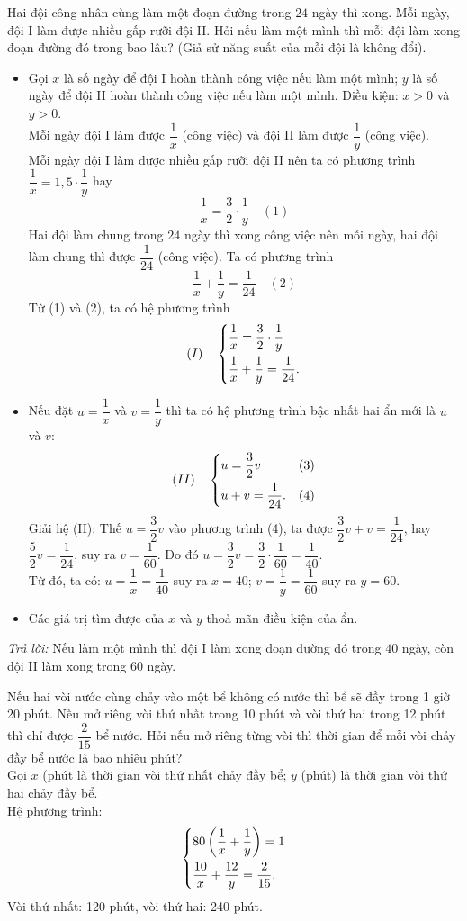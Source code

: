 \begin{vidu}
	Hai đội công nhân cùng làm một đoạn đường trong $24$ ngày thì xong. Mỗi ngày, đội I làm được nhiều gấp rưỡi đội II. Hỏi nếu làm một mình thì mỗi đội làm xong đoạn đường đó trong bao lâu? (Giả sử năng suất của mỗi đội là không đổi).
	\doicot
	\begin{itemize}
		\item Gọi $x$ là số ngày để đội I hoàn thành công việc nếu làm một mình; $y$ là số ngày để đội II hoàn thành công việc nếu làm một mình. Điều kiện: $x > 0$ và $y > 0$.\\
		Mỗi ngày đội I làm được $\dfrac{1}{x}$ (công việc) và đội II làm được $\dfrac{1}{y}$ (công việc).\\
		Mỗi ngày đội I làm được nhiều gấp rưỡi đội II nên ta có phương trình $\dfrac{1}{x} = 1,5 \cdot \dfrac{1}{y}$ hay 
		$$\dfrac{1}{x} = \dfrac{3}{2} \cdot \dfrac{1}{y} \quad (1)$$
		Hai đội làm chung trong $24$ ngày thì xong công việc nên mỗi ngày, hai đội làm chung thì được $\dfrac{1}{24}$ (công việc). Ta có phương trình
		$$\dfrac{1}{x} + \dfrac{1}{y} = \dfrac{1}{24} \quad (2)$$
		Từ (1) và (2), ta có hệ phương trình 
		$$(I)\quad\left\{\begin{aligned}&\dfrac{1}{x} = \dfrac{3}{2} \cdot \dfrac{1}{y} \\ &\dfrac{1}{x} + \dfrac{1}{y} = \dfrac{1}{24}.\end{aligned}\right.$$
		\item Nếu đặt $u = \dfrac{1}{x}$ và $v = \dfrac{1}{y}$ thì ta có hệ phương trình bậc nhất hai ẩn mới là $u$ và $v$:
		$$(II)\quad\left\{\begin{aligned}&u = \dfrac{3}{2}v & (3) \\ &u + v = \dfrac{1}{24}. & (4)\end{aligned}\right.$$
		Giải hệ (II): Thế $u = \dfrac{3}{2}v$ vào phương trình (4), ta được $\dfrac{3}{2}v + v = \dfrac{1}{24}$, hay $\dfrac{5}{2}v = \dfrac{1}{24}$, suy ra $v = \dfrac{1}{60}$. Do đó $u = \dfrac{3}{2}v = \dfrac{3}{2} \cdot \dfrac{1}{60} = \dfrac{1}{40}$.\\
		Từ đó, ta có:
		$u = \dfrac{1}{x} = \dfrac{1}{40}$ suy ra $x = 40$; $v = \dfrac{1}{y} = \dfrac{1}{60}$ suy ra $y = 60$.
		\item Các giá trị tìm được của $x$ và $y$ thoả mãn điều kiện của ẩn.
	\end{itemize}
	\textit{Trả lời:} Nếu làm một mình thì đội I làm xong đoạn đường đó trong $40$ ngày, còn đội II làm xong trong $60$ ngày.
\end{vidu}

\begin{luyentap}
	Nếu hai vòi nước cùng chảy vào một bể không có nước thì bể sẽ đầy trong 1 giờ 20 phút. Nếu mở riêng vòi thứ nhất trong 10 phút và vòi thứ hai trong 12 phút thì chỉ được $\dfrac{2}{15}$ bể nước. Hỏi nếu mở riêng từng vòi thì thời gian để mỗi vòi chảy đầy bể nước là bao nhiêu phút?
	\doicot
	\huongdan\\
	Gọi $x$ (phút là thời gian vòi thứ nhất chảy đầy bể; $y$ (phút) là thời gian vòi thứ hai chảy đầy bể.\\
	Hệ phương trình:
	$$\left\{\begin{aligned}&80\left(\dfrac{1}{x}+\dfrac{1}{y}\right)=1\\&\dfrac{10}{x}+\dfrac{12}{y}=\dfrac{2}{15}.\end{aligned}\right.$$
	Vòi thứ nhất: 120 phút, vòi thứ hai: 240 phút.
\end{luyentap}


